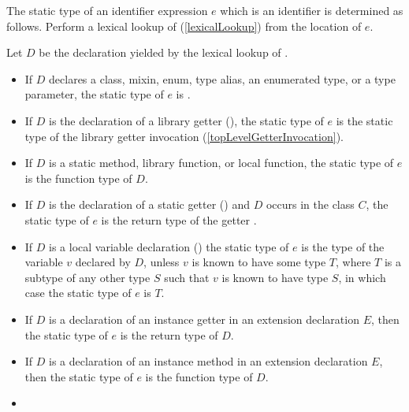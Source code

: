 \documentclass[makeidx]{article}
\begin{document}
{\LMHash{}%
The static type of an identifier expression $e$ which is an identifier \id{}
is determined as follows.
Perform a lexical lookup of \id{}
(\ref{lexicalLookup})
from the location of $e$.

\LMHash{}%
Let $D$ be the declaration yielded by the lexical lookup of \id.

\begin{itemize}
\item
  If $D$ declares a class, mixin, enum, type alias, an enumerated type,
  or a type parameter,
  the static type of $e$ is .
\item
  If $D$ is the declaration of a library getter
  (),
  the static type of $e$ is the static type of the
  library getter invocation \id{}
  (\ref{topLevelGetterInvocation}).
\item
  If $D$ is a static method, library function, or local function,
  the static type of $e$ is the function type of $D$.

\item
  If $D$ is the declaration of a static getter
  ()
  and $D$ occurs in the class $C$,
  the static type of $e$ is the return type of the getter
  .
\item
  If $D$ is a local variable declaration
  ()
  the static type of $e$ is the type of the variable $v$ declared by $D$,
  unless $v$ is known to have some type $T$,
  where $T$ is a subtype of any other type $S$
  such that $v$ is known to have type $S$,
  in which case the static type of $e$ is $T$.
\item
  If $D$ is a declaration of an instance getter
  in an extension declaration $E$,
  then the static type of $e$ is the return type of $D$.
\item
  If $D$ is a declaration of an instance method
  in an extension declaration $E$,
  then the static type of $e$ is the function type of $D$.
\item
\end{itemize}
\vspace{-1ex}
\EndCase

}
\end{document}
